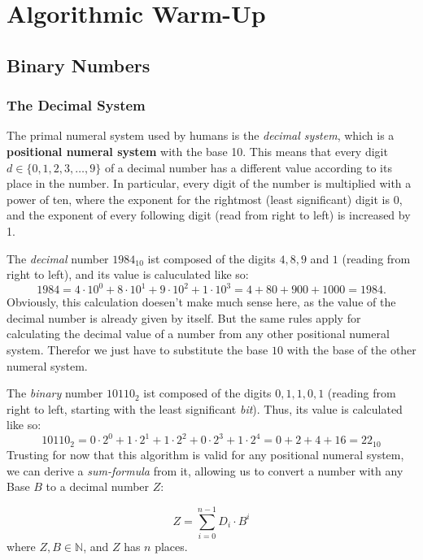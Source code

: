 \chapter{Algorithmic Warm-Up}

\section{Binary Numbers}

\subsection{The Decimal System}

The primal numeral system used by humans is the \emph{decimal system}, which is a \textbf{positional numeral system} with the base 10.
This means that every digit $d \in \{0,1,2,3,\ldots,9\}$ of a decimal number has a different value according to its place in the number.
In particular, every digit of the number is multiplied with a power of ten, where the exponent for the rightmost (least significant) digit is 0, and the exponent of every following digit (read from right to left) is increased by 1.

The \emph{decimal} number $1984_{10}$ ist composed of the digits $4,8,9$ and $1$ (reading from right to left), and its value is caluculated like so:
\begin{equation*}
1984=4\cdot10^0+8\cdot10^1+9\cdot10^2+1\cdot10^3=4+80+900+1000=1984.
\end{equation*}
Obviously, this calculation doesen't make much sense here, as the value of the decimal number is already given by itself.
But the same rules apply for calculating the decimal value of a number from any other positional numeral system.
Therefor we just have to substitute the base $10$ with the base of the other numeral system.

The \emph{binary} number $10110_2$ ist composed of the digits $0,1,1,0,1$ (reading from right to left, starting with the least significant \emph{bit}). 
Thus, its value is calculated like so:
\begin{equation*}
10110_2=0\cdot2^0+1\cdot2^1+1\cdot2^2+0\cdot2^3+1\cdot2^4=0+2+4+16=22_{10}
\end{equation*}
Trusting for now that this algorithm is valid for any positional numeral system, we can derive a \emph{sum-formula} from it, allowing us to convert a number with any Base $B$ to a decimal number $Z$:

\begin{equation} \label{eq:sum}
\boxed{Z=\sum_{i=0}^{n-1} D_i \cdot B^i}
\end{equation}
where $Z,B \in \mathbb{N}$, and $Z$ has $n$ places.

